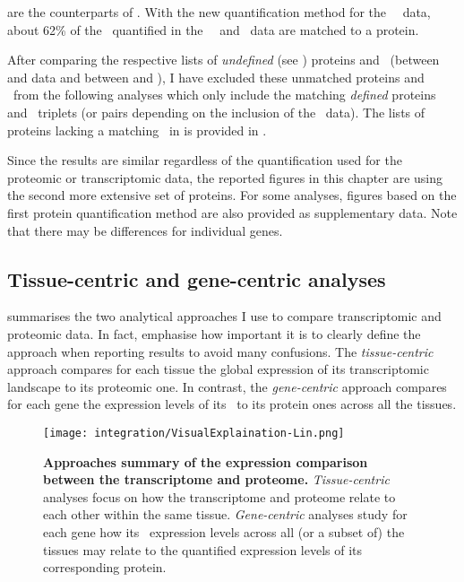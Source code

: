  are
the counterparts of .
With the new quantification method for the \pandey\ \etal\ data,
about 62\% of the \mRNAs\ quantified in the \uhlen\ \etal\ and \gtex\ data
are matched to a protein.

After comparing the respective lists of \emph{undefined} (see )
proteins and \mRNAs\ (between  and  data and
between  and ),
I have excluded these unmatched proteins and \mRNAs\ from the following analyses
which only include the matching \emph{defined} proteins and \mRNAs\ triplets
(or pairs depending on the inclusion of the \gtex\ data).
The lists of proteins lacking a matching \mRNAs\ in  is provided
in .

Since the results are similar regardless of the quantification used
for the proteomic or transcriptomic data,
the reported figures in this chapter are using
the second more extensive set of proteins.
For some analyses,
figures based on the first protein quantification method
are also provided as supplementary data.
Note that there may be differences for individual genes.

\subsection{Tissue-centric and gene-centric analyses}

 summarises the two analytical approaches I use
to compare transcriptomic and proteomic data.
In fact,
\citet{Liu2016-re} emphasise how important it is to clearly define
the approach when reporting results to avoid many confusions.
The \emph{tissue-centric} approach compares for each tissue
the global expression of its transcriptomic landscape to its proteomic one.
In contrast,
the \emph{gene-centric} approach compares for each gene
the expression levels of its \mRNA\ to its protein ones across all the tissues.

\begin{figure}[!htpb]
    \texttt{[image: integration/VisualExplaination-Lin.png]}\centering
    \caption[Summary of the expression comparison approaches between
    the transcriptome and proteome]{\label{fig:visualexp}\textbf{Approaches
    summary of the expression comparison between the transcriptome and proteome.}
    \emph{Tissue-centric} analyses focus on
    how the transcriptome and proteome relate to each other within the same tissue.
    \emph{Gene-centric} analyses study for each gene how its \mRNA\ expression
    levels across all (or a subset of) the tissues may relate to
    the quantified expression levels of its corresponding protein.
    }
\end{figure}


